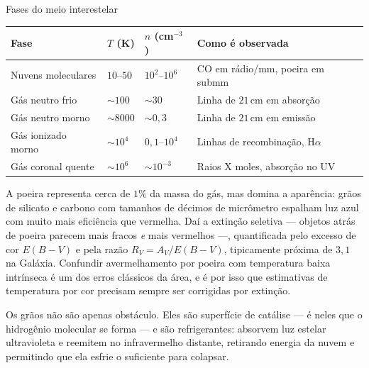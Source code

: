 \documentclass[11pt,a4paper]{article}
\begin{document}
\begin{lessonblock}{Fases do meio interestelar}
\begin{tabular}{>{\raggedright\arraybackslash}p{}>{\raggedright\arraybackslash}p{}>{\raggedright\arraybackslash}p{}>{\raggedright\arraybackslash}p{}}
\toprule
Fase & $T$ (K) & $n$ (cm$^{-3}$) & Como é observada \\
\midrule
Nuvens moleculares & $10$--$50$ & $10^{2}$--$10^{6}$ & CO em rádio/mm, poeira em submm \\
Gás neutro frio & $\sim100$ & $\sim30$ & Linha de $21\,\mathrm{cm}$ em absorção \\
Gás neutro morno & $\sim8000$ & $\sim0{,}3$ & Linha de $21\,\mathrm{cm}$ em emissão \\
Gás ionizado morno & $\sim10^{4}$ & $0{,}1$--$10^{4}$ & Linhas de recombinação, H$\alpha$ \\
Gás coronal quente & $\sim10^{6}$ & $\sim10^{-3}$ & Raios X moles, absorção no UV \\
\bottomrule
\end{tabular}
\end{lessonblock}

A poeira representa cerca de $1\%$ da massa do gás, mas domina a aparência: grãos de silicato e carbono com tamanhos de décimos de micrômetro espalham luz azul com muito mais eficiência que vermelha. Daí a extinção seletiva --- objetos atrás de poeira parecem mais fracos \emph{e} mais vermelhos ---, quantificada pelo excesso de cor $E(B-V)$ e pela razão $R_V=A_V/E(B-V)$, tipicamente próxima de $3{,}1$ na Galáxia. Confundir avermelhamento por poeira com temperatura baixa intrínseca é um dos erros clássicos da área, e é por isso que estimativas de temperatura por cor precisam sempre ser corrigidas por extinção.

Os grãos não são apenas obstáculo. Eles são superfície de catálise --- é neles que o hidrogênio molecular se forma --- e são refrigerantes: absorvem luz estelar ultravioleta e reemitem no infravermelho distante, retirando energia da nuvem e permitindo que ela esfrie o suficiente para colapsar.
\end{document}
